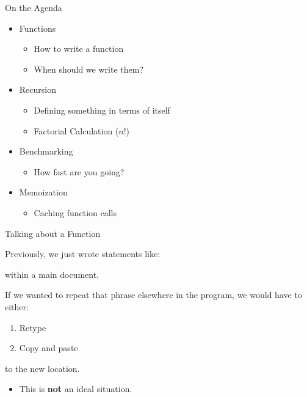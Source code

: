 \begin{frame}{On the Agenda}

\begin{itemize}
\tightlist
\item
  Functions

  \begin{itemize}
  \tightlist
  \item
    How to write a function
  \item
    When should we write them?
  \end{itemize}
\item
  Recursion

  \begin{itemize}
  \tightlist
  \item
    Defining something in terms of itself
  \item
    Factorial Calculation (\(n!\))
  \end{itemize}
\item
  Benchmarking

  \begin{itemize}
  \tightlist
  \item
    How fast are you going?
  \end{itemize}
\item
  Memoization

  \begin{itemize}
  \tightlist
  \item
    Caching function calls
  \end{itemize}
\end{itemize}

\end{frame}

\begin{frame}[fragile]{Talking about a Function}

Previously, we just wrote statements like:

\begin{Shaded}
\begin{Highlighting}[]
\NormalTok{(}\NormalTok{)}
\end{Highlighting}
\end{Shaded}

within a main document.

If we wanted to repeat that phrase elsewhere in the program, we would
have to either:

\begin{enumerate}
\def\labelenumi{\arabic{enumi}.}
\tightlist
\item
  Retype
\item
  Copy and paste
\end{enumerate}

to the new location.

\begin{itemize}
\tightlist
\item
  This is \textbf{not} an ideal situation.
\end{itemize}

\end{frame}

